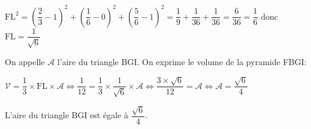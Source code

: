 \begin{enumerate}
\begin{enumerate}
$\text{FL}^2 = \left (\dfrac{2}{3} -1\right )^2 + \left (\dfrac{1}{6}-0 \right )^2 + \left (\dfrac{5}{6} -1\right )^2
= \dfrac{1}{9} + \dfrac{1}{36} + \dfrac{1}{36} = \dfrac{6}{36} = \dfrac{1}{6}$
donc
$\text{FL} = \dfrac{1}{\sqrt{6}}$

On appelle $\mathcal{A}$ l'aire du triangle BGI.
On exprime le volume de la pyramide FBGI:

$\mathcal{V} = \dfrac{1}{3}\times \text{FL}\times \mathcal{A}
\iff
\dfrac{1}{12} = \dfrac{1}{3}\times \dfrac{1}{\sqrt{6}} \times \mathcal{A}
\iff
\dfrac{3\times \sqrt{6}}{12} = \mathcal{A}
\iff
\mathcal{A} = \dfrac{\sqrt{6}}{4}$

L'aire du triangle BGI est égale à $ \dfrac{\sqrt{6}}{4}$.

\end{enumerate}

\end{enumerate}

\bigskip


